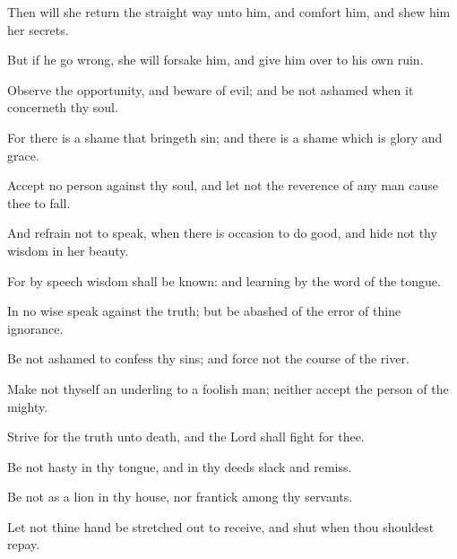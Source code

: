 {\par }{\PP {}Then will she return the straight way unto him, and comfort him, and shew him her secrets.
\par }{\PP {}But if he go wrong, she will forsake him, and give him over to his own ruin.
\par }{\PP {}Observe the opportunity, and beware of evil; and be not ashamed when it concerneth thy soul.
\par }{\PP {}For there is a shame that bringeth sin; and there is a shame which is glory and grace.
\par }{\PP {}Accept no person against thy soul, and let not the reverence of any man cause thee to fall.
\par }{\PP {}And refrain not to speak, when there is occasion to do good, and hide not thy wisdom in her beauty.
\par }{\PP {}For by speech wisdom shall be known: and learning by the word of the tongue.
\par }{\PP {}In no wise speak against the truth; but be abashed of the error of thine ignorance.
\par }{\PP {}Be not ashamed to confess thy sins; and force not the course of the river.
\par }{\PP {}Make not thyself an underling to a foolish man; neither accept the person of the mighty.
\par }{\PP {}Strive for the truth unto death, and the Lord shall fight for thee.
\par }{\PP {}Be not hasty in thy tongue, and in thy deeds slack and remiss.
\par }{\PP {}Be not as a lion in thy house, nor frantick among thy servants.
\par }{\PP {}Let not thine hand be stretched out to receive, and shut when thou shouldest repay.

}
